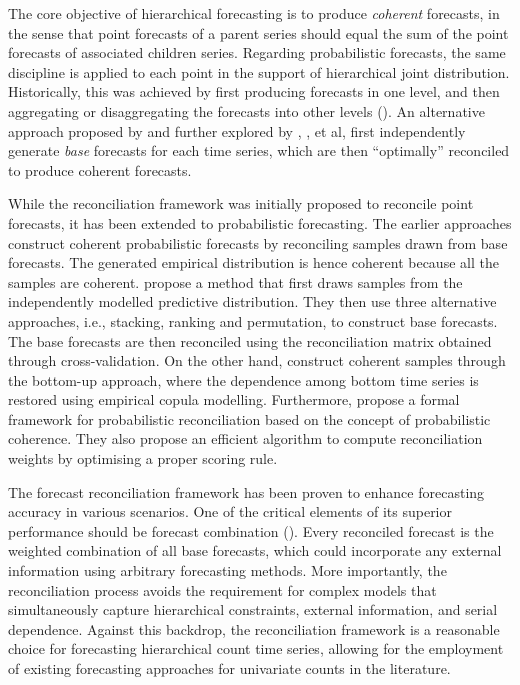 \documentclass[a4paper,review,12pt,authoryear]{elsarticle}
\begin{document}
The core objective of hierarchical forecasting is to produce \textit{coherent} forecasts, 
in the sense that point forecasts of a parent series should equal the sum of the point forecasts of associated children series. 
Regarding probabilistic forecasts, the same discipline is applied to each point in the support of hierarchical joint distribution.
Historically, this was achieved by first producing forecasts in one level, 
and then aggregating or disaggregating the forecasts into other levels (\citealp{fliednerHierarchicalForecastingIssues2001}). 
An alternative approach proposed by \cite{hyndmanOptimalCombinationForecasts2011} and further explored by \cite{wickramasuriyaOptimalForecastReconciliation2019}, \cite{ anagiotelisForecastReconciliationGeometric2021}, et al, 
first independently generate \textit{base} forecasts for each time series, 
which are then ``optimally'' reconciled to produce coherent forecasts.

While the reconciliation framework was initially proposed to reconcile point forecasts, it has been extended to probabilistic forecasting. 
The earlier approaches construct coherent probabilistic forecasts by reconciling samples drawn from base forecasts. 
The generated empirical distribution is hence coherent because all the samples are coherent.
\cite{jeonProbabilisticForecastReconciliation2019} propose a method that first draws samples from the independently modelled predictive distribution. 
They then use three alternative approaches, i.e., stacking, ranking and permutation, to construct base forecasts. 
The base forecasts are then reconciled using the reconciliation matrix obtained through cross-validation. 
On the other hand, \cite{bentaiebHierarchicalProbabilisticForecasting2020} construct coherent samples through the bottom-up approach, 
where the dependence among bottom time series is restored using empirical copula modelling.
Furthermore, \cite{panagiotelisProbabilisticForecastReconciliation2022} propose a formal framework for probabilistic reconciliation based on the concept of probabilistic coherence. 
They also propose an efficient algorithm to compute reconciliation weights by optimising a proper scoring rule. 

The forecast reconciliation framework has been proven to enhance forecasting accuracy in various scenarios. 
One of the critical elements of its superior performance should be forecast combination (\citealp{hollymanUnderstandingForecastReconciliation2021}). 
Every reconciled forecast is the weighted combination of all base forecasts,
which could incorporate any external information using arbitrary forecasting methods.
More importantly, the reconciliation process avoids the requirement for complex models that simultaneously capture hierarchical constraints, external information, and serial dependence.
Against this backdrop, the reconciliation framework is a reasonable choice for forecasting hierarchical count time series,
allowing for the employment of existing forecasting approaches for univariate counts in the literature.
\end{document}
